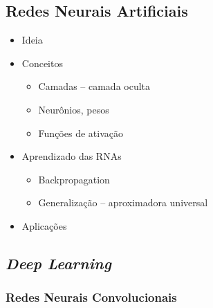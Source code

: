 \subsection{Redes Neurais Artificiais}
\begin{itemize}
	\item Ideia
	\item Conceitos
	\begin{itemize}
		\item Camadas -- camada oculta
		\item Neurônios, pesos
		\item Funções de ativação
	\end{itemize}
	\item Aprendizado das RNAs
	\begin{itemize}
		\item Backpropagation
		\item Generalização -- aproximadora universal
	\end{itemize}
	\item Aplicações
\end{itemize}
\subsection{\textit{Deep Learning}}
\subsubsection{Redes Neurais Convolucionais}